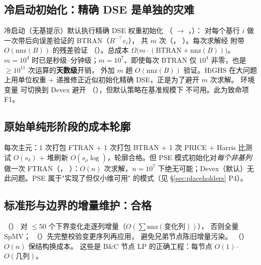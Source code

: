 \documentclass[11pt]{ctexart}
\newcommand{\nnz}{\mathrm{nnz}}
\begin{document}
\subsection{冷启动初始化：精确 DSE 是单独的灾难}
\label{sec:dseinit}
冷启动（无基提示）默认执行精确 DSE 权重初始化
（ $\to$
，）：
对每个基行 $i$ 做一次带后向误差验证的 BTRAN（$B^{-\top}e_i$），
共 $m$ 次（，
）。每次求解经
 附带 $O(\nnz(B))$ 的残差验证
（）。总成本
$\Omega\!\big(m\cdot(\text{BTRAN} + \nnz(B))\big)$。
$m=10^{4}$ 时已是秒级--分钟级；$m=10^{7}$、即使每次 BTRAN 仅
$10^{4}$ 非零，也是 $\ge 10^{11}$ 次运算的\textbf{天数级}开销，
外加 $m$ 趟 $O(\nnz(B))$ 验证。HiGHS 在大问题上用单位权重 +
递推修正近似初始化精确 DSE，正是为了避开 $m$ 次求解。
环境变量  可切换到 Devex 避开
（），但默认策略在基准规模下
不可用。此为致命项 F1。

\subsection{原始单纯形阶段的成本轮廓}
 每次主元：1 次打包 FTRAN + 1 次打包 BTRAN +
1 次 PRICE + Harris 比测试 $O(s_\delta)$ + 堆刷新
$O(s_\rho\log)$，轮廓合格。但 PSE 模式初始化对\emph{每个非基列}
做一次 FTRAN（，
）：$O(n)$ 次求解，$n=10^{7}$
下绝无可能；Devex（默认）无此问题。PSE 属于"实现了但仅小维可用"
的模式（见 \S\ref{sec:placeholders} P4）。

\subsection{标准形与边界的增量维护：合格}
（）
对 $\le 50$ 个下界变化走逐列增量（$O(\sum \nnz(\text{变化列}))$），
否则全量 SpMV；
（）先完整校验变更序列再应用，
避免兄弟节点陈旧增量污染。
（）$O(n)$ 保结构换成本。
这些是 B\&C 节点 LP 的正确工程：每节点 $O(1)$--$O(\text{几列})$。
\end{document}

